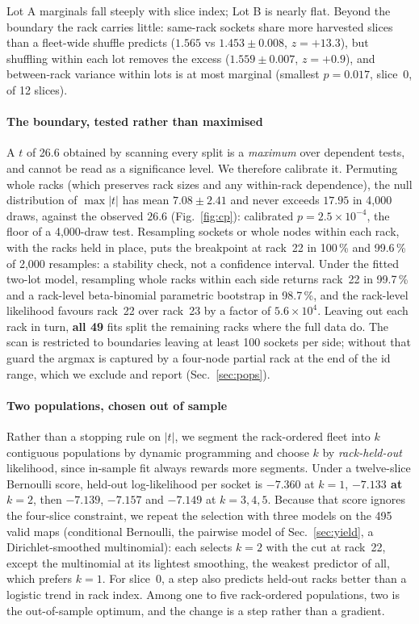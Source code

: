 \documentclass[10pt,conference]{IEEEtran}
\begin{document}
Lot A marginals fall steeply with slice index; Lot B is nearly flat. Beyond the boundary the rack
carries little: same-rack sockets share more harvested slices than a fleet-wide shuffle predicts
($1.565$ vs $1.453\pm0.008$, $z=+13.3$), but shuffling within each lot removes the excess
($1.559\pm0.007$, $z=+0.9$), and between-rack variance within lots is at most marginal (smallest
$p=0.017$, slice~0, of 12 slices).

\paragraph*{The boundary, tested rather than maximised}
\label{par:changepoint}
A $t$ of 26.6 obtained by scanning every split is a \emph{maximum} over dependent tests, and
cannot be read as a significance level. We therefore calibrate it. Permuting whole racks (which
preserves rack sizes and any within-rack dependence), the null distribution of
$\max|t|$ has mean $7.08\pm2.41$ and never exceeds $17.95$ in 4{,}000 draws, against the observed
$26.6$ (Fig.~\ref{fig:cp}): calibrated $p=2.5\times10^{-4}$, the floor of a 4{,}000-draw test.
Resampling sockets or whole nodes within each rack, with the racks held in place, puts the
breakpoint at rack~22 in 100\,\% and 99.6\,\% of 2{,}000 resamples: a stability check, not a
confidence interval. Under the fitted two-lot model, resampling whole racks within each side
returns rack~22 in 99.7\,\% and a rack-level beta-binomial parametric bootstrap in 98.7\,\%, and
the rack-level likelihood favours rack~22 over rack~23 by a factor of $5.6\times10^{4}$. Leaving
out each rack in turn, \textbf{all 49} fits split the remaining racks where the full data do. The
scan is restricted to boundaries leaving at least 100 sockets per side; without that guard the
argmax is captured by a four-node partial rack at the end of the id range, which we exclude and
report (Sec.~\ref{sec:pops}).

\paragraph*{Two populations, chosen out of sample} Rather than a stopping rule on $|t|$, we segment
the rack-ordered fleet into $k$ contiguous populations by dynamic programming and choose $k$ by
\emph{rack-held-out} likelihood, since in-sample fit always rewards more segments. Under a
twelve-slice Bernoulli score, held-out log-likelihood per socket is $-7.360$ at $k=1$,
\textbf{$-7.133$ at $k=2$}, then $-7.139$, $-7.157$ and $-7.149$ at $k=3,4,5$. Because that score
ignores the four-slice constraint, we repeat the selection with three models on the 495 valid maps
(conditional Bernoulli, the pairwise model of Sec.~\ref{sec:yield}, a Dirichlet-smoothed
multinomial): each selects $k=2$ with the cut at rack~22, except the multinomial at its lightest
smoothing, the weakest predictor of all, which prefers $k=1$. For slice~0, a step also predicts
held-out racks better than a logistic trend in rack index. Among one to five rack-ordered
populations, two is the out-of-sample optimum, and the change is a step rather than a gradient.
\end{document}
